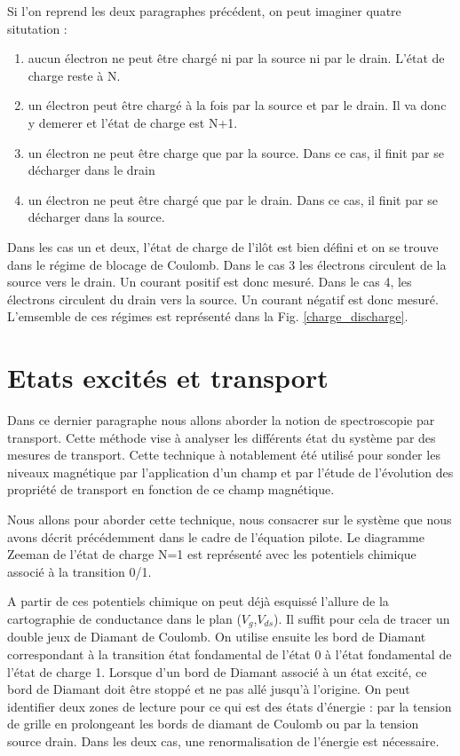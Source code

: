 Si l'on reprend les deux paragraphes précédent, on peut imaginer quatre situtation :
\begin{enumerate}
\item aucun électron ne peut \^etre chargé ni par la source ni par le drain. L'état de charge reste à N.
\item un électron peut \^etre chargé à la fois par la source et par le drain. Il va donc y demerer et l'état de charge est N+1.
\item un électron ne peut \^etre charge que par la source. Dans ce cas, il finit par se décharger dans le drain
\item un électron ne peut \^etre chargé que par le drain. Dans ce cas, il finit par se décharger dans la source.
\end{enumerate}
Dans les cas un et deux, l'état de charge de l'il\^ot est bien défini et on se trouve dans le régime de blocage de Coulomb. Dans le cas 3 les électrons circulent de la source vers le drain. Un courant positif est donc mesuré. Dans le cas 4, les électrons circulent du drain vers la source. Un courant négatif est donc mesuré. L'emsemble de ces régimes est représenté dans la Fig. \ref{charge_discharge}.










\section{Etats excités et transport}
Dans ce dernier paragraphe nous allons aborder la notion de spectroscopie par transport. Cette méthode vise à analyser les différents état du système par des mesures de transport. Cette technique à notablement été utilisé pour sonder les niveaux magnétique par l'application d'un champ et par l'étude de l'évolution des propriété de transport en fonction de ce champ magnétique.

Nous allons pour aborder cette technique, nous consacrer sur le système que nous avons décrit précédemment dans le cadre de l'équation pilote. Le diagramme Zeeman de l'état de charge N=1 est représenté avec les potentiels chimique associé à la transition 0/1.

A partir de ces potentiels chimique on peut déjà esquissé l'allure de la cartographie de conductance dans le plan ($V_g$,$V_{ds}$). Il suffit pour cela de tracer un double jeux de Diamant de Coulomb. On utilise ensuite les bord de Diamant correspondant à la transition état fondamental de l'état 0 à l'état fondamental de l'état de charge 1. Lorsque d'un bord de Diamant associé à un état excité, ce bord de Diamant doit \^etre stoppé et ne pas allé jusqu'à l'origine. On peut identifier deux zones de lecture pour ce qui est des états d'énergie : par la tension de grille en prolongeant les bords de diamant de Coulomb ou par la tension source drain. Dans les deux cas, une renormalisation de l'énergie est nécessaire.

